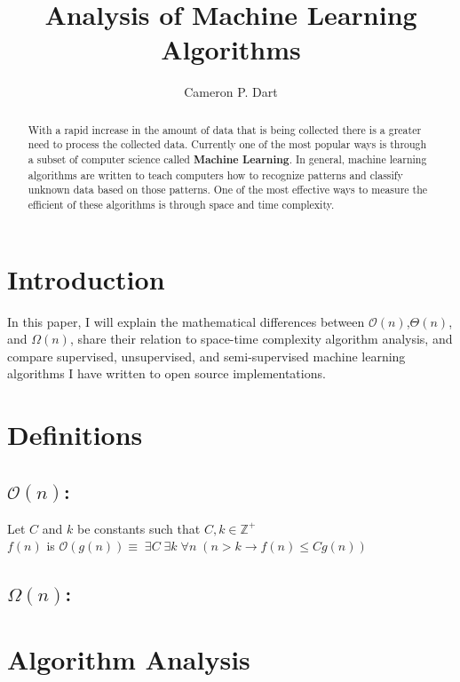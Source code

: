 \documentclass{achemso}
\author{Cameron P. Dart}
\affiliation{Math 348 - Fundamental Mathematics - University of Illinois at Urbana-Champaign}
\affiliation{Department of Mathematics}
\title{Analysis of Machine Learning Algorithms}
\newenvironment{definition}[1][Formal Definition]{\begin{trivlist}\item[\hskip \labelsep {\bfseries #1}]}{\end{trivlist}}
\newenvironment{indef}[1][Informal Definition]{\begin{trivlist}\item[\hskip \labelsep {\bfseries #1}]}{\end{trivlist}}
\begin{document}
\begin{abstract}With a rapid increase in the amount of data that is being collected there is a greater need to process the collected data. Currently one of the most popular ways is through a subset of computer science called 
\textbf{Machine Learning}. In general, machine learning algorithms are written to teach computers how to recognize patterns and classify unknown data based on those patterns. One of the most effective ways to measure the efficient of these algorithms is through space and time complexity. 
\end{abstract}
\section{Introduction}In this paper, I will explain the mathematical differences between $\mathcal{O}(n)$,$\Theta(n)$, and $\Omega(n)$, share their relation to space-time complexity algorithm analysis, and compare supervised, unsupervised, and semi-supervised machine learning algorithms I have written to open source implementations.
\section{Definitions}
\subsection{$\mathcal{O}(n)$:} 
\begin{definition} Let $C$ and $k$ be constants such that $C , k \in \mathbb{Z}^+$ \\
$f(n)$ is $ \mathcal{O}(g(n)) \equiv \; \exists C \; \exists k \; \forall n \;(n > k \rightarrow f(n) \leq Cg(n))$
\end{definition}
\begin{indef} 
\end{indef}

\subsection{$\Omega(n)$:}
\begin{definition}
\end{definition}
\begin{indef}	
\end{indef}

\section{Algorithm Analysis}
\end{document}
